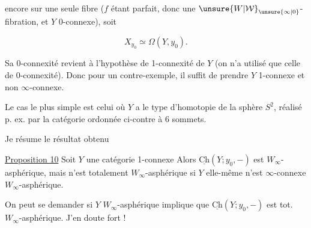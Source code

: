 
encore sur une seule fibre ($f$ étant parfait, donc une $\unsure{W|\mathcal W}_{\unsure{\infty|0}}$-fibration, et $Y$ 0-connexe), soit

\[
 X_{y_0}\simeq\Omega(Y,y_0).
\]

Sa 0-connexité revient à l'hypothèse de 1-connexité de $Y$ (on n'a utilisé  que celle de 0-connexité). Donc pour un contre-exemple, il suffit de prendre $Y$ 1-connexe et non $\infty$-connexe.

Le cas le plus simple est celui où $Y$ a le type d'homotopie de la sphère $S^2$, réalisé p. ex. par la catégorie ordonnée ci-contre à 6 sommets.




Je résume le résultat obtenu

\uline{Proposition 10} Soit $Y$ une  catégorie 1-connexe Alors $\underline{\mathrm{Ch}}(Y;y_0,-)$ est $W_\infty$-asphérique, mais n'est  totalement $W_\infty$-asphérique si $Y$ elle-même n'est $\infty$-connexe  $W_\infty$-asphérique.


On peut se demander si $Y$ $W_\infty$-asphérique implique que $\underline{\mathrm{Ch}}(Y;y_0,-)$ est tot. $W_\infty$-asphérique. J'en doute fort !
